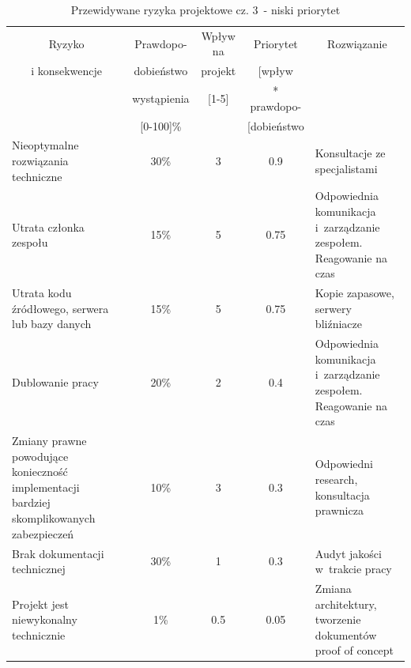 \documentclass[a4paper,11pt]{article}
\begin{document}
\begin{table}[H]
	\centering
	\caption{Przewidywane ryzyka projektowe cz. 3~- niski priorytet}
	\bgroup
	\begin{tabular}{|p{5cm}|c|c|c|p{5cm}|}
		\hline
		\multicolumn{1}{|c|}{Ryzyko} & \multicolumn{1}{c|}{Prawdopo-} & \multicolumn{1}{c|}{Wpływ na} & \multicolumn{1}{c|}{Priorytet } & \multicolumn{1}{c|}{Rozwiązanie} \\
		\multicolumn{1}{|c|}{i konsekwencje} & \multicolumn{1}{c|}{dobieństwo} & \multicolumn{1}{c|}{projekt} & \multicolumn{1}{c|}{[wpływ} &  \\
		\multicolumn{1}{|c|}{} & \multicolumn{1}{c|}{wystąpienia} & \multicolumn{1}{c|}{[1-5]} & \multicolumn{1}{c|}{* prawdopo-} & \multicolumn{1}{c|}{} \\
		\multicolumn{1}{|c|}{} & \multicolumn{1}{c|}{[0-100]\%} & \multicolumn{1}{c|}{} & \multicolumn{1}{c|}{[dobieństwo} &  \\ \hline \hline
		
		
		Nieoptymalne rozwiązania techniczne & 30\% & 3 & 0.9 & Konsultacje ze specjalistami
		\\ \hline
		Utrata członka zespołu & 15\% & 5 & 0.75 & Odpowiednia komunikacja i~zarządzanie zespołem. Reagowanie na czas
		\\ \hline
		Utrata kodu źródłowego, serwera lub bazy danych & 15\% & 5 & 0.75 & Kopie zapasowe, serwery bliźniacze
		\\ \hline
		Dublowanie pracy & 20\% & 2 & 0.4 & Odpowiednia komunikacja i~zarządzanie zespołem. Reagowanie na czas
		\\ \hline
		Zmiany prawne powodujące konieczność implementacji bardziej skomplikowanych zabezpieczeń & 10\% & 3 & 0.3 & Odpowiedni research, konsultacja prawnicza
		\\ \hline
		Brak dokumentacji technicznej & 30\% & 1 & 0.3 & Audyt jakości w~trakcie pracy
		\\ \hline
		Projekt jest niewykonalny technicznie & 1\% & 0.5 & 0.05 & Zmiana architektury, tworzenie dokumentów proof of concept
		\\ \hline
		
		
		
		
		
	\end{tabular}
	\egroup
\end{table}

\newpage
\end{document}
